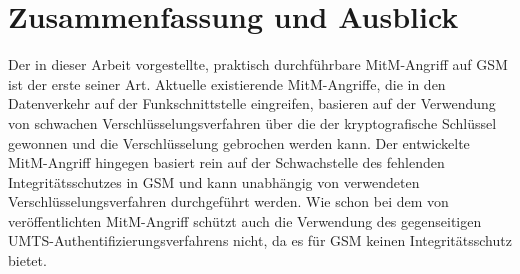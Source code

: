 \chapter{Zusammenfassung und Ausblick} \label{hdl:ausblick}
Der in dieser Arbeit vorgestellte, praktisch durchführbare \ac{MitM}-Angriff auf \ac{GSM} ist der erste seiner Art. Aktuelle existierende \ac{MitM}-Angriffe, die in den Datenverkehr auf der Funkschnittstelle eingreifen, basieren auf der Verwendung von schwachen Verschlüsselungsverfahren über die der kryptografische Schlüssel gewonnen und die Verschlüsselung gebrochen werden kann. Der entwickelte \ac{MitM}-Angriff hingegen basiert rein auf der Schwachstelle des fehlenden Integritätsschutzes in \ac{GSM} und kann unabhängig von verwendeten Verschlüsselungsverfahren durchgeführt werden. Wie schon bei dem von \citet{meyer2004man} veröffentlichten \ac{MitM}-Angriff schützt auch die Verwendung des gegenseitigen \ac{UMTS}-Authentifizierungsverfahrens nicht, da es für \ac{GSM} keinen Integritätsschutz bietet.

